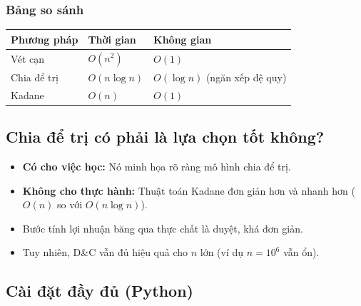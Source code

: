 \documentclass{article}
\begin{document}
\subsubsection{Bảng so sánh}

\begin{tabular}{|l|l|l|}
\hline
\textbf{Phương pháp} & \textbf{Thời gian} & \textbf{Không gian} \\
\hline
Vét cạn & \(O(n^2)\) & \(O(1)\) \\
Chia để trị & \(O(n \log n)\) & \(O(\log n)\) (ngăn xếp đệ quy) \\
Kadane & \(O(n)\) & \(O(1)\) \\
\hline
\end{tabular}

\subsection{Chia để trị có phải là lựa chọn tốt không?}

\begin{itemize}
    \item \textbf{Có cho việc học:} Nó minh họa rõ ràng mô hình chia để trị.
    \item \textbf{Không cho thực hành:} Thuật toán Kadane đơn giản hơn và nhanh hơn (\(O(n)\) so với \(O(n \log n)\)).
    \item Bước tính lợi nhuận băng qua thực chất là duyệt, khá đơn giản.
    \item Tuy nhiên, D\&C vẫn đủ hiệu quả cho \(n\) lớn (ví dụ \(n = 10^6\) vẫn ổn).
\end{itemize}

\subsection{Cài đặt đầy đủ (Python)}
\end{document}
